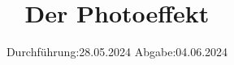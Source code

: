 

\subject{V500}
\title{Der Photoeffekt}
\date{%
  Durchführung:28.05.2024
  \hspace{3em}
  Abgabe:04.06.2024
}



\maketitle
\thispagestyle{empty}
\tableofcontents
\newpage






\printbibliography{}


